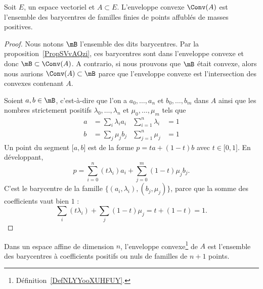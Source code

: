 \begin{proposition} \label{PropYHMTmZX}
	Soit \( E\), un espace vectoriel et \( A\subset E\). L'enveloppe convexe \( \Conv(A)\) est l'ensemble des barycentres de familles finies de points affublés de masses positives.
\end{proposition}

\begin{proof}
	Nous notons \( \mB\) l'ensemble des dits barycentres. Par la proposition~\ref{PropSVvAQzi}, ces barycentres sont dans l'enveloppe convexe et donc \( \mB\subset\Conv(A)\). A contrario, si nous prouvons que \( \mB\) était convexe, alors nous aurions \( \Conv(A)\subset\mB\) parce que l'enveloppe convexe est l'intersection des convexes contenant \( A\).

	Soient \( a,b\in\mB\), c'est-à-dire que l'on a \( a_0,\ldots, a_n\) et \( b_0,\ldots, b_m\) dans \( A\) ainsi que les nombres strictement positifs \( \lambda_0,\ldots, \lambda_n\) et \( \mu_0,\ldots, \mu_m\) tels que
	\begin{subequations}
		\begin{align}
			a & =\sum_i\lambda_ia_i & \sum_{i=1}^n\lambda_i & =1 \\
			b & =\sum_j\mu_jb_j     & \sum_{j=1}^n\mu_j     & =1
		\end{align}
	\end{subequations}
	Un point du segment \( \mathopen[ a , b \mathclose]\) est de la forme \( p=ta+(1-t)b\) avec \( t\in \mathopen[ 0 , 1 \mathclose]\). En développant,
	\begin{equation}
		p=\sum_{i=0}^n(t\lambda_i)a_i+\sum_{j=0}^m(1-t)\mu_jb_j.
	\end{equation}
	C'est le barycentre de la famille \( \{ (a_i,\lambda_i),(b_j,\mu_j) \}\), parce que la somme des coefficients vaut bien \( 1\) :
	\begin{equation}
		\sum_i(t\lambda_i)+\sum_j(1-t)\mu_j=t+(1-t)=1.
	\end{equation}
\end{proof}


\begin{theorem} \label{ThoJLDjXLe}
	Dans un espace affine de dimension \( n\), l'enveloppe convexe\footnote{Définition~\ref{DefNLYYooXUHFUY}.} de \( A\) est l'ensemble des barycentres à coefficients positifs ou nuls de familles de \( n+1\) points.
\end{theorem}

